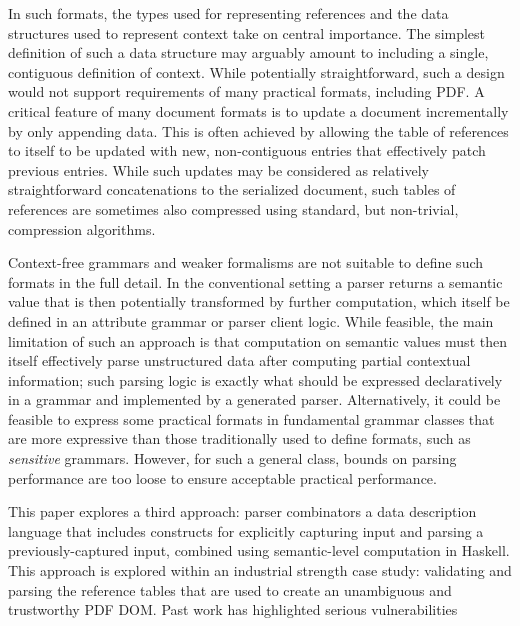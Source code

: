 In such formats, the types used for representing references and the
data structures used to represent context take on central importance.
%
The simplest definition of such a data structure may arguably amount
to including a single, contiguous definition of context.
%
While potentially straightforward, such a design would not support
requirements of many practical formats, including PDF.
%
A critical feature of many document formats is to update a
document incrementally by only appending data. This is often achieved
by allowing the table of references to itself to be updated with new,
non-contiguous entries that effectively patch previous entries.
%
While such updates may be considered as relatively straightforward concatenations to 
the serialized document, such tables of references are sometimes also compressed 
using standard, but non-trivial, compression algorithms.

Context-free grammars and weaker formalisms are not suitable to define
such formats in the full detail.
%
In the conventional setting a parser returns a semantic value
that is then potentially transformed by further computation, which 
itself be defined in an attribute grammar or parser client logic.
%
While feasible, the main limitation of such an approach is that
computation on semantic values must then itself effectively parse
unstructured data after computing partial contextual information;
%
such parsing logic is exactly what should be expressed declaratively
in a grammar and implemented by a generated parser.
%
Alternatively, it could be feasible to express some
practical formats in fundamental grammar classes that are more
expressive than those traditionally used to define formats, such as
\emph{sensitive} grammars.
%
However, for such a general class, bounds on parsing performance are
too loose to ensure acceptable practical performance.

This paper explores a third approach: parser combinators a data
description language that includes constructs for explicitly capturing
input and parsing a previously-captured input, combined using
semantic-level computation in Haskell.
%
This approach is explored within an industrial strength case study:
validating and parsing the reference tables that are used to create 
an unambiguous and trustworthy PDF DOM. Past work \cite{} has highlighted serious
vulnerabilities 


